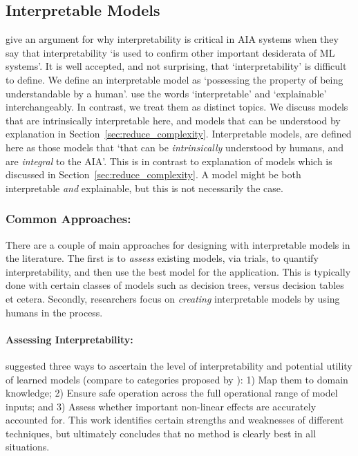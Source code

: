 \subsection{Interpretable Models} \label{sec:interp_models}
\citet{Doshi-Velez2017-xy} give an argument for why interpretability is critical in AIA systems when they say that interpretability `is used to confirm other important desiderata of ML systems'. It is well accepted, and not surprising, that `interpretability' is difficult to define. We define an interpretable model as `possessing the property of being understandable by a human'. \cite{Doshi-Velez2017-xy} use the words `interpretable' and `explainable' interchangeably. In contrast, we treat them as distinct topics. We discuss models that are intrinsically interpretable here, and models that can be understood by explanation in Section~\ref{sec:reduce_complexity}. Interpretable models, are defined here as those models that `that can be \emph{intrinsically} understood by humans, and are \emph{integral} to the AIA'. This is in contrast to explanation of models which is discussed in Section~\ref{sec:reduce_complexity}. A model might be both interpretable \emph{and} explainable, but this is not necessarily the case.

\subsubsection{Common Approaches:}
There are a couple of main approaches for designing with interpretable models in the literature. The first is to \emph{assess} existing models, via trials, to quantify interpretability, and then use the best model for the application. This is typically done with certain classes of models such as decision trees, versus decision tables et cetera. Secondly, researchers focus on \emph{creating} interpretable models by using humans in the process.

\paragraph{Assessing Interpretability:}
\citet{Van_Belle2013-ph} suggested three ways to ascertain the level of interpretability and potential utility of learned models (compare to categories proposed by \citet{Lipton2016-ug}): 1) Map them to domain knowledge; 2) Ensure safe operation across the full operational range of model inputs; and 3) Assess whether important non-linear effects are accurately accounted for. This work identifies certain strengths and weaknesses of different techniques, but ultimately concludes that no method is clearly best in all situations.

